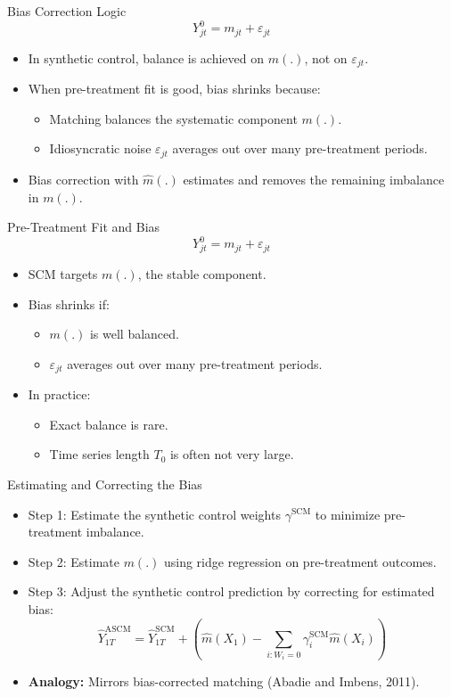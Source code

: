 \documentclass{beamer}
\begin{document}
\begin{frame}{Bias Correction Logic}
\small
\[
Y_{jt}^0 = m_{jt} + \varepsilon_{jt}
\]
\begin{itemize}
  \item In synthetic control, balance is achieved on $m(.)$, not on $\varepsilon_{jt}$.
  \item When pre-treatment fit is good, bias shrinks because:
  \begin{itemize}
    \item Matching balances the systematic component $m(.)$.
    \item Idiosyncratic noise $\varepsilon_{jt}$ averages out over many pre-treatment periods.
  \end{itemize}
  \item Bias correction with $\widehat{m}(.)$ estimates and removes the remaining imbalance in $m(.)$.
\end{itemize}
\end{frame}


\begin{frame}{Pre-Treatment Fit and Bias}
\small
\[
Y_{jt}^0 = m_{jt} + \varepsilon_{jt}
\]
\begin{itemize}
  \item SCM targets $m(.)$, the stable component.
  \item Bias shrinks if:
  \begin{itemize}
    \item $m(.)$ is well balanced.
    \item $\varepsilon_{jt}$ averages out over many pre-treatment periods.
  \end{itemize}
  \item In practice:
  \begin{itemize}
    \item Exact balance is rare.
    \item Time series length $T_0$ is often not very large.
  \end{itemize}
\end{itemize}
\end{frame}


\begin{frame}{Estimating and Correcting the Bias}
\small
\begin{itemize}
  \item Step 1: Estimate the synthetic control weights $\gamma^{\text{SCM}}$ to minimize pre-treatment imbalance.
  \item Step 2: Estimate $m(.)$ using ridge regression on pre-treatment outcomes.
  \item Step 3: Adjust the synthetic control prediction by correcting for estimated bias:
  \[
  \hat{Y}_{1T}^{\text{ASCM}} = \hat{Y}_{1T}^{\text{SCM}} + \left( \hat{m}(X_1) - \sum_{i: W_i=0} \gamma_i^{\text{SCM}} \hat{m}(X_i) \right)
  \]
  \item \textbf{Analogy:} Mirrors bias-corrected matching (Abadie and Imbens, 2011).
\end{itemize}
\end{frame}
\end{document}
